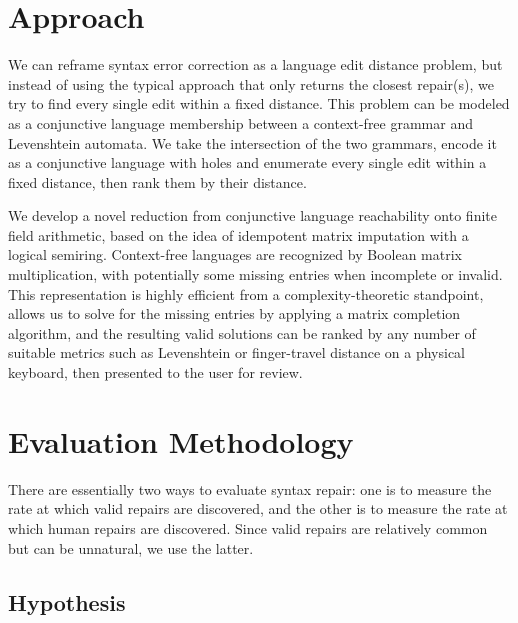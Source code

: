\documentclass[sigplan,screen]{acmart}
\begin{document}
\section{Approach}


We can reframe syntax error correction as a language edit distance problem, but instead of using the typical approach that only returns the closest repair(s), we try to find every single edit within a fixed distance. This problem can be modeled as a conjunctive language membership between a context-free grammar and Levenshtein automata. We take the intersection of the two grammars, encode it as a conjunctive language with holes and enumerate every single edit within a fixed distance, then rank them by their distance.

We develop a novel reduction from conjunctive language reachability onto finite field arithmetic, based on the idea of idempotent matrix imputation with a logical semiring. Context-free languages are recognized by Boolean matrix multiplication, with potentially some missing entries when incomplete or invalid. This representation is highly efficient from a complexity-theoretic standpoint, allows us to solve for the missing entries by applying a matrix completion algorithm, and the resulting valid solutions can be ranked by any number of suitable metrics such as Levenshtein or finger-travel distance on a physical keyboard, then presented to the user for review.

\section{Evaluation Methodology}


There are essentially two ways to evaluate syntax repair: one is to measure the rate at which valid repairs are discovered, and the other is to measure the rate at which human repairs are discovered. Since valid repairs are relatively common but can be unnatural, we use the latter.

\subsection{Hypothesis}
\end{document}
